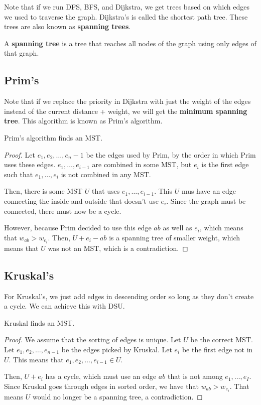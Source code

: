 
Note that if we run DFS, BFS, and Dijkstra, we get trees based on which edges we used to traverse the graph. Dijkstra's is called the shortest path tree. These trees are also known as \textbf{spanning trees}.

\begin{definition}
	A \textbf{spanning tree} is a tree that reaches all nodes of the graph using only edges of that graph.
\end{definition}

\subsection{Prim's}

Note that if we replace the priority in Dijkstra with just the weight of the edges instead of the current distance + weight, we will get the \textbf{minimum spanning tree}. This algorithm is known as Prim's algorithm.

\begin{theorem}
	Prim's algorithm finds an MST.
\end{theorem}
\begin{proof}
	Let \( e_{1}, e_{2}, \ldots, e_n-1  \) be the edges used by Prim, by the order in which Prim uses these edges. \( e_{1}, \ldots , e_{i-1} \) are combined in some MST, but \( e_i \) is the first edge such that \( e_{1}, \ldots , e_i \) is not combined in any MST.

	Then, there is some MST \( U \) that uses \( e_{1}, \ldots , e_{i-1} \). This \( U \) mus have an edge connecting the inside and outside that doesn't use \( e_i \). Since the graph must be connected, there must now be a cycle.

	However, because Prim decided to use this edge \( ab \) as well as \( e_i \), which means that \( w_{ab} > w_{e_i} \). Then, \( U + e_i - ab \) is a spanning tree of smaller weight, which means that \( U \) was not an MST, which is a contradiction.
\end{proof}

\subsection{Kruskal's}

For Kruskal's, we just add edges in descending order so long as they don't create a cycle. We can achieve this with DSU.

\begin{theorem}
	Kruskal finds an MST.
\end{theorem}
\begin{proof}
	We assume that the sorting of edges is unique. Let \( U \) be the correct MST. Let \( e_{1}, e_{2}, \ldots , e_{n-1} \) be the edges picked by Kruskal. Let \( e_i \) be the first edge not in \( U \). This means that \( e_{1}, e_{2}, \ldots , e_{i-1} \in U \).

	Then, \( U + e_i \) has a cycle, which must use an edge \( ab \) that is not among \( e_{1}, \ldots ,e_I \). Since Kruskal goes through edges in sorted order, we have that \( w_{ab}>w_{e_i} \). That means \( U \) would no longer be a spanning tree, a contradiction.
\end{proof}
